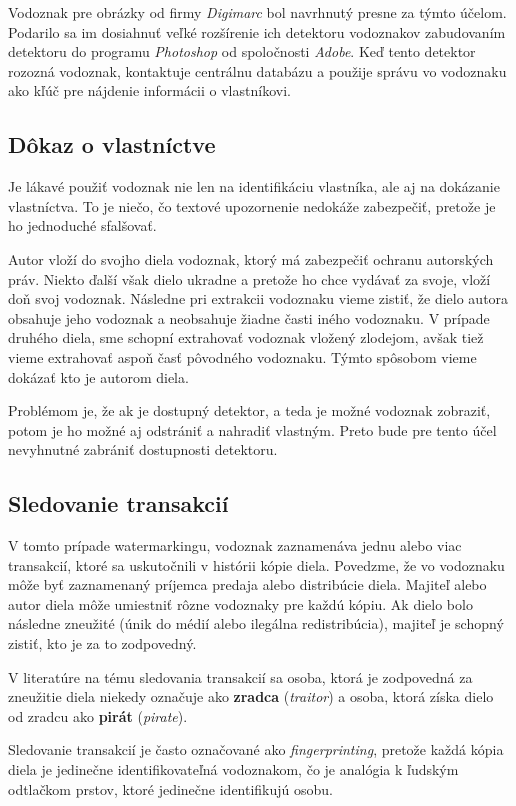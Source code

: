 Vodoznak pre obrázky od firmy {\it Digimarc} bol navrhnutý presne za týmto účelom. Podarilo sa im dosiahnuť veľké rozšírenie ich detektoru vodoznakov zabudovaním detektoru do programu {\it Photoshop} od spoločnosti {\it Adobe}. Keď tento detektor rozozná vodoznak, kontaktuje centrálnu databázu a použije správu vo vodoznaku ako kľúč pre nájdenie informácii o vlastníkovi. \cite{Cox}

\subsection{Dôkaz o vlastníctve}
Je lákavé použiť vodoznak nie len na identifikáciu vlastníka, ale aj na dokázanie vlastníctva. To je niečo, čo textové upozornenie nedokáže zabezpečiť, pretože je ho jednoduché sfalšovať.

Autor vloží do svojho diela vodoznak, ktorý má zabezpečiť ochranu autorských práv. Niekto ďalší však dielo ukradne a pretože ho chce vydávať za svoje, vloží doň svoj vodoznak. Následne pri extrakcii vodoznaku vieme zistiť, že dielo autora obsahuje jeho vodoznak a neobsahuje žiadne časti iného vodoznaku. V prípade druhého diela, sme schopní extrahovať vodoznak vložený zlodejom, avšak tiež vieme extrahovať aspoň časť pôvodného vodoznaku. Týmto spôsobom vieme dokázať kto je autorom diela.

Problémom je, že ak je dostupný detektor, a teda je možné vodoznak zobraziť, potom je ho možné aj odstrániť a nahradiť vlastným. Preto bude pre tento účel nevyhnutné zabrániť dostupnosti detektoru. \cite{Cox}

\subsection{Sledovanie transakcií}
V tomto prípade watermarkingu, vodoznak zaznamenáva jednu alebo viac transakcií, ktoré sa uskutočnili v histórii kópie diela. Povedzme, že vo vodoznaku môže byť zaznamenaný príjemca predaja alebo distribúcie diela. Majiteľ alebo autor diela môže umiestniť rôzne vodoznaky pre každú kópiu. Ak dielo bolo následne zneužité (únik do médií alebo ilegálna redistribúcia), majiteľ je schopný zistiť, kto je za to zodpovedný.

V literatúre na tému sledovania transakcií sa osoba, ktorá je zodpovedná za zneužitie diela niekedy označuje ako {\bf zradca} ({\it traitor}) a osoba, ktorá získa dielo od zradcu ako {\bf pirát} ({\it pirate}).

Sledovanie transakcií je často označované ako {\it fingerprinting}, pretože každá kópia diela je jedinečne identifikovateľná vodoznakom, čo je analógia k ľudským odtlačkom prstov, ktoré jedinečne identifikujú osobu.

